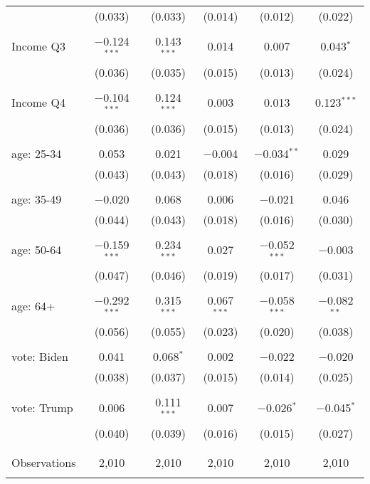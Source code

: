 \begin{tabular}{@{\extracolsep{5pt}}lccccc}
  & (0.033) & (0.033) & (0.014) & (0.012) & (0.022) \\ 
  & & & & & \\ 
 Income Q3 & $-$0.124$^{***}$ & 0.143$^{***}$ & 0.014 & 0.007 & 0.043$^{*}$ \\ 
  & (0.036) & (0.035) & (0.015) & (0.013) & (0.024) \\ 
  & & & & & \\ 
 Income Q4 & $-$0.104$^{***}$ & 0.124$^{***}$ & 0.003 & 0.013 & 0.123$^{***}$ \\ 
  & (0.036) & (0.036) & (0.015) & (0.013) & (0.024) \\ 
  & & & & & \\ 
 age: 25-34 & 0.053 & 0.021 & $-$0.004 & $-$0.034$^{**}$ & 0.029 \\ 
  & (0.043) & (0.043) & (0.018) & (0.016) & (0.029) \\ 
  & & & & & \\ 
 age: 35-49 & $-$0.020 & 0.068 & 0.006 & $-$0.021 & 0.046 \\ 
  & (0.044) & (0.043) & (0.018) & (0.016) & (0.030) \\ 
  & & & & & \\ 
 age: 50-64 & $-$0.159$^{***}$ & 0.234$^{***}$ & 0.027 & $-$0.052$^{***}$ & $-$0.003 \\ 
  & (0.047) & (0.046) & (0.019) & (0.017) & (0.031) \\ 
  & & & & & \\ 
 age: 64+ & $-$0.292$^{***}$ & 0.315$^{***}$ & 0.067$^{***}$ & $-$0.058$^{***}$ & $-$0.082$^{**}$ \\ 
  & (0.056) & (0.055) & (0.023) & (0.020) & (0.038) \\ 
  & & & & & \\ 
 vote: Biden & 0.041 & 0.068$^{*}$ & 0.002 & $-$0.022 & $-$0.020 \\ 
  & (0.038) & (0.037) & (0.015) & (0.014) & (0.025) \\ 
  & & & & & \\ 
 vote: Trump & 0.006 & 0.111$^{***}$ & 0.007 & $-$0.026$^{*}$ & $-$0.045$^{*}$ \\ 
  & (0.040) & (0.039) & (0.016) & (0.015) & (0.027) \\ 
  & & & & & \\ 
\hline \\[-1.8ex] 

Observations & 2,010 & 2,010 & 2,010 & 2,010 & 2,010 \\ 
\hline 
\hline \\[-1.8ex] 
\end{tabular} 